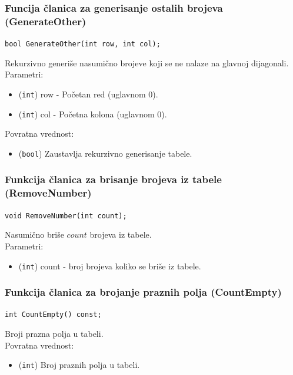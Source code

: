 \documentclass[a4paper]{article}
\begin{document}
    \subsubsection{Funcija članica za generisanje ostalih brojeva (GenerateOther)}
    \texttt{bool GenerateOther(int row, int col);}
    \par Rekurzivno generiše nasumično brojeve koji se ne nalaze na glavnoj dijagonali.\\
	Parametri:
    \begin{itemize}
        \item (\texttt{int}) row - Početan red (uglavnom 0).
        \item (\texttt{int}) col - Početna kolona (uglavnom 0).
    \end{itemize}
    Povratna vrednost:
    \begin{itemize}
        \item (\texttt{bool}) Zaustavlja rekurzivno generisanje tabele.
    \end{itemize}

    \subsubsection{Funkcija članica za brisanje brojeva iz tabele (RemoveNumber)}
	\texttt{void RemoveNumber(int count);}
    \par Nasumično briše $count$ brojeva iz tabele.\\
    Parametri:
    \begin{itemize}
        \item (\texttt{int}) count - broj brojeva koliko se briše iz tabele.
    \end{itemize}

    \subsubsection{Funkcija članica za brojanje praznih polja (CountEmpty)}
    \texttt{int CountEmpty() const;}
    \par Broji prazna polja u tabeli.\\
    Povratna vrednost:
    \begin{itemize}
        \item (\texttt{int}) Broj praznih polja u tabeli.
    \end{itemize}
\end{document}
